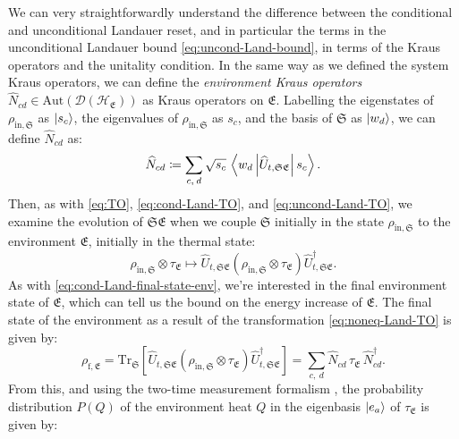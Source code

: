 \documentclass[preprints,article,accept,moreauthors,pdftex]{Definitions/mdpi}
\begin{document}
\begin{paracol}{2}
We can very straightforwardly understand the difference between the conditional and unconditional Landauer reset, and in particular the terms in the unconditional Landauer bound \eqref{eq:uncond-Land-bound}, in terms of the Kraus operators and the unitality condition. In the same way as we defined the system Kraus operators, we can define the \emph{environment Kraus operators} $\widehat{N}_{cd}\in\mathrm{Aut}\left(\mathcal{D}\left(\mathcal{H}_{\mathfrak{E}}\right)\right)$ as Kraus operators on $\mathfrak{E}$. Labelling the eigenstates of $\rho_{\mathrm{in},\mathfrak{S}}$ as $\ket{s_{c}}$, the eigenvalues of $\rho_{\mathrm{in},\mathfrak{S}}$ as $s_{c}$, and the basis of $\mathfrak{S}$ as $\ket{w_{d}}$, we can define $\widehat{N}_{cd}$ as:
\begin{equation}
    \label{eq:env-Kraus-op}
    \widehat{N}_{cd}\coloneqq \sum_{c,\:d}
    \sqrt{s_{c}}\,\Braket{w_{d}|\!\widehat{U}_{t,\mathfrak{SE}}\!|s_{c}}.
\end{equation}
Then, as with \eqref{eq:TO}, \eqref{eq:cond-Land-TO}, and \eqref{eq:uncond-Land-TO}, we examine the evolution of $\mathfrak{SE}$ when we couple $\mathfrak{S}$ initially in the state $\rho_{\mathrm{in},\mathfrak{S}}$ to the environment $\mathfrak{E}$, initially in the thermal state:
\begin{equation}
    \label{eq:noneq-Land-TO}
    \rho_{\mathrm{in},\mathfrak{S}}\otimes\tau_{\mathfrak{E}} \mapsto \widehat{U}_{t,\mathfrak{SE}} \left(\rho_{\mathrm{in},\mathfrak{S}}\otimes\tau_{\mathfrak{E}}\right)\widehat{U}_{t,\mathfrak{SE}}^{\dagger}.
\end{equation}
As with \eqref{eq:cond-Land-final-state-env}, we're interested in the final environment state of $\mathfrak{E}$, which can tell us the bound on the energy increase of $\mathfrak{E}$. The final state of the environment as a result of the transformation \eqref{eq:noneq-Land-TO} is given by:
\begin{equation}
    \label{eq:noneq-Land-final-state-env}
    \rho_{\mathrm{f},\mathfrak{E}} = \mathrm{Tr}_{\mathfrak{S}}\left[\widehat{U}_{t,\mathfrak{SE}}\left(\rho_{\mathrm{in},\mathfrak{S}}\otimes\tau_{\mathfrak{E}}\right)\widehat{U}_{t,\mathfrak{SE}}^{\dagger}\right] = \sum_{c,\:d}\widehat{N}_{cd}\,\tau_{\mathfrak{E}}\,\widehat{N}_{cd}^{\dagger}.
\end{equation}
From this, and using the two-time measurement formalism \cite{TLH07}, the probability distribution $P\left(Q\right)$ of the environment heat $Q$ in the eigenbasis $\ket{e_{a}}$ of $\tau_{\mathfrak{E}}$ is given \cite{Goold15} by:

\end{paracol}
\end{document}
